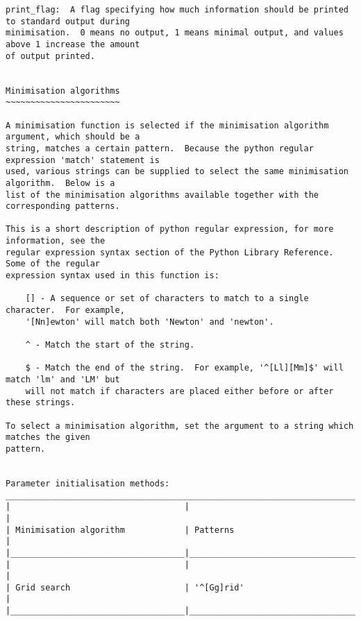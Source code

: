 \begin{verbatim}
print_flag:  A flag specifying how much information should be printed to standard output during
minimisation.  0 means no output, 1 means minimal output, and values above 1 increase the amount
of output printed.


Minimisation algorithms
~~~~~~~~~~~~~~~~~~~~~~~

A minimisation function is selected if the minimisation algorithm argument, which should be a
string, matches a certain pattern.  Because the python regular expression 'match' statement is
used, various strings can be supplied to select the same minimisation algorithm.  Below is a
list of the minimisation algorithms available together with the corresponding patterns.

This is a short description of python regular expression, for more information, see the
regular expression syntax section of the Python Library Reference.  Some of the regular
expression syntax used in this function is:

    [] - A sequence or set of characters to match to a single character.  For example,
    '[Nn]ewton' will match both 'Newton' and 'newton'.

    ^ - Match the start of the string.

    $ - Match the end of the string.  For example, '^[Ll][Mm]$' will match 'lm' and 'LM' but
    will not match if characters are placed either before or after these strings.

To select a minimisation algorithm, set the argument to a string which matches the given
pattern.


Parameter initialisation methods:
___________________________________________________________________________________________
|                                   |                                                     |
| Minimisation algorithm            | Patterns                                            |
|___________________________________|_____________________________________________________|
|                                   |                                                     |
| Grid search                       | '^[Gg]rid'                                          |
|___________________________________|_____________________________________________________|



\end{verbatim}
